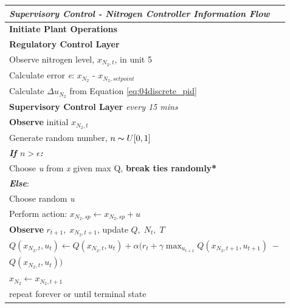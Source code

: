 \begin{table}[H]
	\begin{tabular}{p{14.5cm}}
	\hline
	\emph{Supervisory Control - Nitrogen Controller Information Flow} \\ \hline
	\textbf{Initiate Plant Operations} \\
	\hspace{0.75cm} \textbf{Regulatory Control Layer} \\
	\hspace{0.75cm} Observe nitrogen level, $x_{N_2, t}$, in unit 5\\
	\hspace{0.75cm} Calculate error \emph{e}: $x_{N_2}$ - $x_{N_2, setpoint}$ \\
	\hspace{0.75cm} Calculate $\Delta u_{N_2}$ from Equation \ref{eq:04discrete_pid} \\
	\hspace{1.5cm} \textbf{Supervisory Control Layer} \emph{every 15 mins} \\
	\hspace{2.25cm} \textbf{Observe} initial $x_{N_2, t}$ \\
	\hspace{2.25cm} Generate random number, $n \thicksim U[0, 1]$ \\
    \hspace{2.25cm} \textbf{\emph{If $n > \epsilon$:}} \\ 
    \hspace{3cm} Choose \emph{u} from \emph{x} given max Q, \textbf{break ties randomly*} \\
    \hspace{2.25cm} \textbf{\emph{Else}}: \\
    \hspace{3cm} Choose random \emph{u} \\
	\hspace{2.25cm} Perform action: $x_{N_2, sp} \leftarrow x_{N_2, sp} + u$ \\
	\hspace{2.25cm} \textbf{Observe} $r_{t+1}, \; x_{N_2, t+1}$, update $Q, \; N_t, \; T$ \\
    \hspace{2.25cm} $Q(x_{N_2, t}, u_t) \leftarrow Q(x_{N_2, t}, u_t) + \alpha(r_t + \gamma \max_{u_{t+1}} Q(x_{N_2, t+1}, u_{t+1}) \; -$ \\ \hspace{5.5cm} $Q(x_{N_2, t}, u_t))$ \\
	\hspace{2.25cm} $x_{N_2} \leftarrow x_{N_2, t+1}$ \\
	\hspace{0.75cm} repeat forever or until terminal state \\
	\hline
	\end{tabular}
\end{table}


